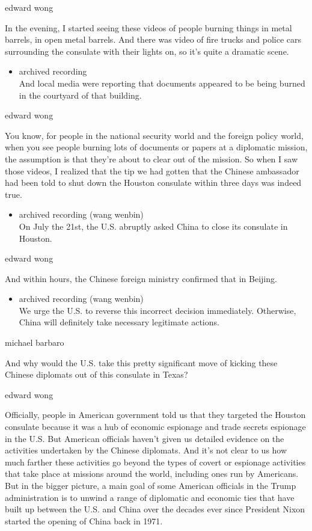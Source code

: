 edward wong

In the evening, I started seeing these videos of people burning things
in metal barrels, in open metal barrels. And there was video of fire
trucks and police cars surrounding the consulate with their lights on,
so it's quite a dramatic scene.

\begin{itemize}
\tightlist
\item
  archived recording\\
  And local media were reporting that documents appeared to be being
  burned in the courtyard of that building.
\end{itemize}

edward wong

You know, for people in the national security world and the foreign
policy world, when you see people burning lots of documents or papers at
a diplomatic mission, the assumption is that they're about to clear out
of the mission. So when I saw those videos, I realized that the tip we
had gotten that the Chinese ambassador had been told to shut down the
Houston consulate within three days was indeed true.

\begin{itemize}
\tightlist
\item
  archived recording (wang wenbin)\\
  On July the 21st, the U.S. abruptly asked China to close its consulate
  in Houston.
\end{itemize}

edward wong

And within hours, the Chinese foreign ministry confirmed that in
Beijing.

\begin{itemize}
\tightlist
\item
  archived recording (wang wenbin)\\
  We urge the U.S. to reverse this incorrect decision immediately.
  Otherwise, China will definitely take necessary legitimate actions.
\end{itemize}

michael barbaro

And why would the U.S. take this pretty significant move of kicking
these Chinese diplomats out of this consulate in Texas?

edward wong

Officially, people in American government told us that they targeted the
Houston consulate because it was a hub of economic espionage and trade
secrets espionage in the U.S. But American officials haven't given us
detailed evidence on the activities undertaken by the Chinese diplomats.
And it's not clear to us how much farther these activities go beyond the
types of covert or espionage activities that take place at missions
around the world, including ones run by Americans. But in the bigger
picture, a main goal of some American officials in the Trump
administration is to unwind a range of diplomatic and economic ties that
have built up between the U.S. and China over the decades ever since
President Nixon started the opening of China back in 1971.

